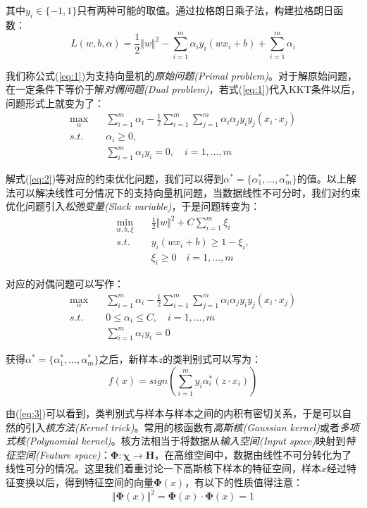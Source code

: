 \documentclass[UTF8, 12pt]{ctexart}
\begin{document}
其中$y_{i} \in \{-1, 1\}$只有两种可能的取值。通过拉格朗日乘子法，构建拉格朗日函数：
\begin{equation}
	L(w,b,\alpha) = \frac{1}{2}{\Vert w \Vert}^{2} - \sum_{i=1}^{m}\alpha_{i}y_{i}(wx_{i}+b)+\sum_{i=1}^{m}\alpha_{i}
	\label{eq:1}
\end{equation}

我们称公式(\ref{eq:1})为支持向量机的\emph{原始问题(Primal problem)}。对于解原始问题，在一定条件下等价于解\emph{对偶问题(Dual problem)}，若式(\ref{eq:1})代入KKT条件以后，问题形式上就变为了：
\begin{align}
	\label{eq:2}
	\max_{\alpha} & \quad \sum_{i=1}^{m}\alpha_{i} - \frac{1}{2}\sum_{i=1}^{m}\sum_{j=1}^{m}\alpha_{i}\alpha_{j}y_{i}y_{j}(x_{i}·x_{j}) \\
	s.t. & \quad \alpha_{i} \geq 0, \\
	{}	 & \quad \sum_{i=1}^{m} \alpha_{i}y_{i} = 0, \quad i=1,...,m
\end{align}

解式(\ref{eq:2})等对应的约束优化问题，我们可以得到$\alpha^{*} = \{\alpha_{1}^{*},...,\alpha_{m}^{*}\}$的值。以上解法可以解决线性可分情况下的支持向量机问题，当数据线性不可分时，我们对约束优化问题引入\emph{松弛变量(Slack variable)}，于是问题转变为：
\begin{align}
	\min_{w,b,\xi} &  \quad \frac{1}{2}{\Vert w \Vert}^{2} + C\sum_{i=1}^{m}\xi_{i}\\
	s.t. &  \quad y_{i}(wx_{i}+b) \geq 1 - \xi_{i},\\
	{}   &  \quad \xi_{i} \geq 0 \quad i = 1, ..., m
\end{align}

对应的对偶问题可以写作：
\begin{align}
	\max_{\alpha} & \quad \sum_{i=1}^{m}{\alpha_{i}} - \frac{1}{2}\sum_{i=1}^{m}\sum_{j=1}^{m}\alpha_{i}\alpha_{j}y_{i}y_{j}(x_{i}·x_{j})\\
	s.t. & \quad 0 \leq \alpha_{i} \leq C, \quad i=1,...,m \\
	{}   & \quad \sum_{i=1}^{m}\alpha_{i}y_{i} = 0
\end{align}

获得$\alpha^{*} = \{\alpha_{1}^{*},...,\alpha_{m}^{*}\}$之后，新样本$z$的类判别式可以写为：
\begin{equation}
\label{eq:3}
	f(x) = sign(\sum_{i=1}^{m}y_{i}\alpha_{i}^{*}(z·x_{i}))
\end{equation}

由(\ref{eq:3})可以看到，类判别式与样本与样本之间的内积有密切关系，于是可以自然的引入\emph{核方法(Kernel trick)}。常用的核函数有\emph{高斯核(Gaussian kernel)}或者\emph{多项式核(Polynomial kernel)}。核方法相当于将数据从\emph{输入空间(Input space)}映射到\emph{特征空间(Feature space)}：$\boldsymbol{\Phi}: \boldsymbol{\chi} \to \boldsymbol{H}$，在高维空间中，数据由线性不可分转化为了线性可分的情况。这里我们着重讨论一下高斯核下样本的特征空间，样本$x$经过特征变换以后，得到特征空间的向量$\boldsymbol{\Phi}(x)$，有以下的性质值得注意：
\begin{equation}
	\label{eq:4}
	{\Vert \boldsymbol{\Phi}(x) \Vert}^{2} = \boldsymbol{\Phi}(x) ·\boldsymbol{\Phi}(x) = 1
\end{equation}
\end{document}
